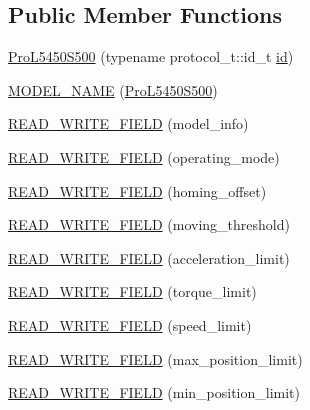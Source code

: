 \subsection*{Public Member Functions}
\begin{DoxyCompactItemize}
\item 
\hyperlink{classdynamixel_1_1servos_1_1_pro_l5450_s500_ae9bdf7cab008ea31d42b0d88808c3ca2}{Pro\+L5450\+S500} (typename protocol\+\_\+t\+::id\+\_\+t \hyperlink{classdynamixel_1_1servos_1_1_servo_a2d022081672e25a7bb57b76706e1cc57}{id})
\item 
\hyperlink{classdynamixel_1_1servos_1_1_pro_l5450_s500_abbd7b4b8460d611b8789d95129da5a7b}{M\+O\+D\+E\+L\+\_\+\+N\+A\+ME} (\hyperlink{classdynamixel_1_1servos_1_1_pro_l5450_s500}{Pro\+L5450\+S500})
\item 
\hyperlink{classdynamixel_1_1servos_1_1_pro_l5450_s500_af52cf5d3c5441dd5d1ab393e9c41b9c9}{R\+E\+A\+D\+\_\+\+W\+R\+I\+T\+E\+\_\+\+F\+I\+E\+LD} (model\+\_\+info)
\item 
\hyperlink{classdynamixel_1_1servos_1_1_pro_l5450_s500_ab9590b9cc75b4322beaf44d5f0f88217}{R\+E\+A\+D\+\_\+\+W\+R\+I\+T\+E\+\_\+\+F\+I\+E\+LD} (operating\+\_\+mode)
\item 
\hyperlink{classdynamixel_1_1servos_1_1_pro_l5450_s500_a82ec7d8dd716b5b530411928bd02a8a4}{R\+E\+A\+D\+\_\+\+W\+R\+I\+T\+E\+\_\+\+F\+I\+E\+LD} (homing\+\_\+offset)
\item 
\hyperlink{classdynamixel_1_1servos_1_1_pro_l5450_s500_a82e5d74a40b67fd1a3f902f64508be0c}{R\+E\+A\+D\+\_\+\+W\+R\+I\+T\+E\+\_\+\+F\+I\+E\+LD} (moving\+\_\+threshold)
\item 
\hyperlink{classdynamixel_1_1servos_1_1_pro_l5450_s500_a42e4d20be67772bf55bc0820863447db}{R\+E\+A\+D\+\_\+\+W\+R\+I\+T\+E\+\_\+\+F\+I\+E\+LD} (acceleration\+\_\+limit)
\item 
\hyperlink{classdynamixel_1_1servos_1_1_pro_l5450_s500_aa32a61533d4206f4f2ec871b0067ddc5}{R\+E\+A\+D\+\_\+\+W\+R\+I\+T\+E\+\_\+\+F\+I\+E\+LD} (torque\+\_\+limit)
\item 
\hyperlink{classdynamixel_1_1servos_1_1_pro_l5450_s500_a0feb9781b6b379c7ce8237798d3e7cdf}{R\+E\+A\+D\+\_\+\+W\+R\+I\+T\+E\+\_\+\+F\+I\+E\+LD} (speed\+\_\+limit)
\item 
\hyperlink{classdynamixel_1_1servos_1_1_pro_l5450_s500_a53c4a10a0b81b4be21c18955159de1f5}{R\+E\+A\+D\+\_\+\+W\+R\+I\+T\+E\+\_\+\+F\+I\+E\+LD} (max\+\_\+position\+\_\+limit)
\item 
\hyperlink{classdynamixel_1_1servos_1_1_pro_l5450_s500_aa43ef3a5efceb293398808c2b921d37b}{R\+E\+A\+D\+\_\+\+W\+R\+I\+T\+E\+\_\+\+F\+I\+E\+LD} (min\+\_\+position\+\_\+limit)

\end{DoxyCompactItemize}
